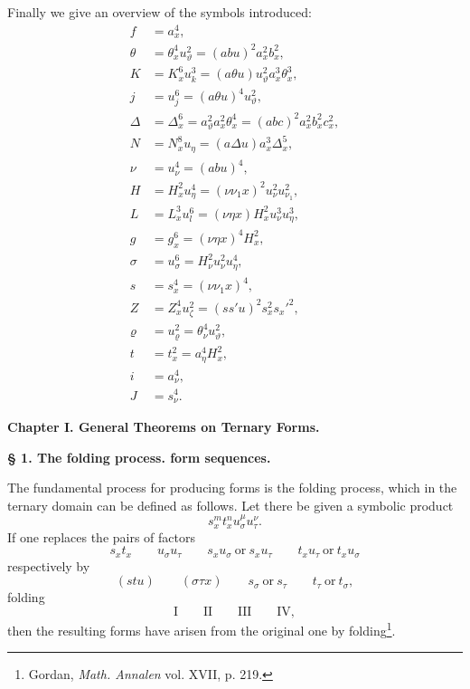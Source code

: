 \documentclass[11pt]{article}
\begin{document}
Finally we give an overview of the symbols introduced:
\begin{align*}
f&=a_x^4,\\
\theta&=\theta_x^4u_\vartheta^2=(abu)^2a_x^2b_x^2,\\
K&=K_x^6u_k^3=(a\theta u)u_\vartheta^2a_x^3\theta_x^3,\\
j&=u_j^6=(a\theta u)^4u_\vartheta^2,\\
\Delta&=\Delta_x^6=a_\vartheta^2a_x^2\theta_x^4=(abc)^2a_x^2b_x^2c_x^2,\\
N&=N_x^8u_\eta=(a\Delta u)a_x^3\Delta_x^5,\\
\nu&=u_\nu^4=(abu)^4,\\
H&=H_x^2u_\eta^4=(\nu\nu_1x)^2u_\nu^2u_{\nu_1}^2,\\
L&=L_x^3u_l^6=(\nu\eta x)H_x^2u_\nu^3u_\eta^3,\\
g&=g_x^6=(\nu\eta x)^4H_x^2,\\
\sigma&=u_\sigma^6=H_\nu^2u_\nu^2u_\eta^4,\\
s&=s_x^4=(\nu\nu_1x)^4,\\
Z&=Z_x^4u_\zeta^2=(ss'u)^2s_x^2s_x'^2,\\
\varrho&=u_\varrho^2=\theta_\nu^4u_\vartheta^2,\\
t&=t_x^2=a_\eta^4H_x^2,\\
i&=a_\nu^4,\\
J&=s_\nu^4.
\end{align*}

\begin{center}
{\Large\bfseries Chapter I. \quad General Theorems on Ternary Forms.}
\end{center}

\begin{center}
\textbf{§ 1. \quad The folding process. \quad form sequences.}
\end{center}

The fundamental process for producing forms is the folding process, which in the ternary domain can be defined as follows. Let there be given a symbolic product
\[
s_x^m t_x^n u_\sigma^\mu u_\tau^\nu .
\]
If one replaces the pairs of factors
\[
s_xt_x\qquad u_\sigma u_\tau\qquad s_xu_\sigma\ \text{or}\ s_xu_\tau
\qquad t_xu_\tau\ \text{or}\ t_xu_\sigma
\]
respectively by
\[
(stu)\qquad (\sigma\tau x)\qquad s_\sigma\ \text{or}\ s_\tau
\qquad t_\tau\ \text{or}\ t_\sigma,
\]
folding
\[
\text{I}\qquad\text{II}\qquad\text{III}\qquad\text{IV},
\]
then the resulting forms have arisen from the original one by folding\footnote{Gordan, \emph{Math. Annalen} vol. XVII, p. 219.}.
\end{document}
